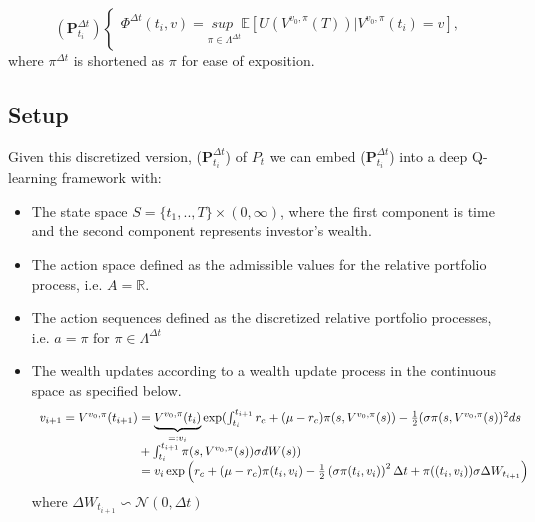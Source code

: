  \begin{equation}\label{equation:pot}
    (\mathbf{P}^{\Delta t}_{t_i})\begin{cases} \Phi^{\Delta t}(t_i,v) = \underset{\pi \in \Lambda^{\Delta t}}{\textit{sup }}\mathbb{ E}[U(V^{v_0,\pi}(T)) | V^{v_0,\pi}(t_i)=v],\end{cases}
\end{equation}
where $\pi^{\Delta t}$ is shortened as $\pi$ for ease of exposition.
\subsection{Setup}
Given this discretized version, ($\mathbf{P}_{t_i}^{\Delta t}$) of $P_t$ we can embed ($\mathbf{P}^{\Delta t}_{t_i}$) into a deep Q-learning framework with:

\begin{itemize}
    \item The state space $S = \{t_1,..,T\} \times (0,\infty)$, where the first component is time and the second component represents investor's wealth.
    \item The action space defined as the admissible values for the relative portfolio process, i.e. $A = \mathbb{R}$.
    \item The action sequences defined as the discretized relative portfolio
processes, i.e. $a = \pi \textrm{ for } \pi \in \Lambda^{\Delta t}$
    \item The wealth updates according to a wealth update process in the continuous space as specified below.
    \begin{equation}
    \begin{array}{l@{}l}
     v_{i+1}=V^{v_0,\pi}(t_{i+1})  &{}= \underbrace{V^{v_0,\pi}(t_{i})}_{=:v_i}\exp(\int_{t_i}^{t_{i+1}} r_c + (\mu-r_c)\pi(s,V^{v_0,\pi}(s)) -\frac{1}{2}(\sigma \pi ( s, V^{v_0,\pi}(s))^2 ds \\
     &{}+\int_{t_i}^{t_{i+1}} \pi(s,V^{v_0,\pi}(s))\sigma dW(s) )\\
     &{}= v_i \exp \left ( r_c+ (\mu-r_c)\pi(t_i,v_i)  -\frac{1}{2}\left(\sigma \pi (t_i,v_i)\right)^2 \Delta t + \pi((t_i,v_i))\sigma \Delta W_{t_{i+1}}\right )
    \end{array}
    \end{equation}
    where $\Delta W_{t_{i+1}} \backsim \mathcal{N}(0,\Delta t)$
    

\end{itemize}
